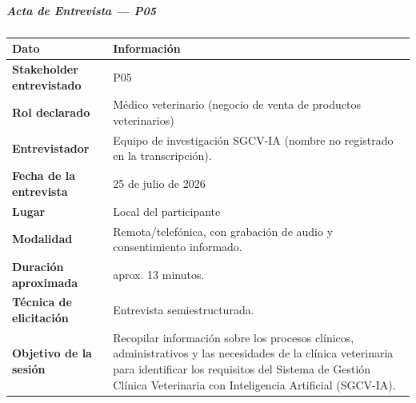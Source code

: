 \documentclass[
]{article}
\newcounter{none} %
\begin{document}
\subparagraph{Acta de Entrevista --- P05}\label{acta-entrevista-p05}

{\def\LTcaptype{none} %
\begin{longtable}[]{|
  >{\raggedright\arraybackslash}p{}|
  >{\raggedright\arraybackslash}p{}|}
\hline
\begin{minipage}[b]{\linewidth}\centering
\textbf{Dato}
\end{minipage} & \begin{minipage}[b]{\linewidth}\centering
\textbf{Información}
\end{minipage} \\
\hline
\endhead
\hline
\endlastfoot
\textbf{Stakeholder entrevistado} & \begin{minipage}[t]{\linewidth}\raggedright
P05
\end{minipage} \\
\hline
\textbf{Rol declarado} & \begin{minipage}[t]{\linewidth}\raggedright
Médico veterinario (negocio de venta de productos veterinarios)
\end{minipage} \\
\hline
\textbf{Entrevistador} & \begin{minipage}[t]{\linewidth}\raggedright
Equipo de investigación SGCV-IA (nombre no registrado en la transcripción).
\end{minipage} \\
\hline
\textbf{Fecha de la entrevista} & \begin{minipage}[t]{\linewidth}\raggedright
25 de julio de 2026
\end{minipage} \\
\hline
\textbf{Lugar} & \begin{minipage}[t]{\linewidth}\raggedright
Local del participante
\end{minipage} \\
\hline
\textbf{Modalidad} & \begin{minipage}[t]{\linewidth}\raggedright
Remota/telefónica, con grabación de audio y consentimiento informado.
\end{minipage} \\
\hline
\textbf{Duración aproximada} & \begin{minipage}[t]{\linewidth}\raggedright
aprox. 13 minutos.
\end{minipage} \\
\hline
\textbf{Técnica de elicitación} & \begin{minipage}[t]{\linewidth}\raggedright
Entrevista semiestructurada.
\end{minipage} \\
\hline
\textbf{Objetivo de la sesión} & \begin{minipage}[t]{\linewidth}\raggedright
Recopilar información sobre los procesos clínicos, administrativos y las necesidades de la clínica veterinaria para identificar los requisitos del Sistema de Gestión Clínica Veterinaria con Inteligencia Artificial (SGCV-IA).
\end{minipage} \\
\hline
\end{longtable}
}
\end{document}
